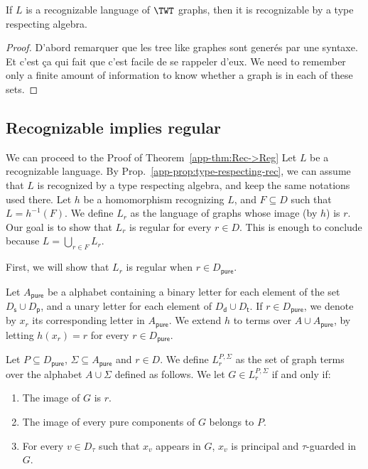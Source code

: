 \begin{lemma}\label{app-prop:type-respecting-rec}
If $L$ is a recognizable language of $\TWT$ graphs, then  it is recognizable by a type respecting algebra.
\end{lemma}

\begin{proof}
D'abord remarquer que les tree like graphes sont generés par une syntaxe. Et c'est ça qui fait que c'est facile de se rappeler d'eux.
We need to remember only a finite amount of information to know whether a graph is in each of these sets. 
\end{proof}





\subsection{Recognizable implies regular}

We can proceed to the Proof of Theorem~\ref{app-thm:Rec->Reg} Let $L$ be a recognizable language. By Prop.~\ref{app-prop:type-respecting-rec}, we can assume that $L$ is recognized by a type respecting algebra, and keep the same notations used there. Let $h$ be a homomorphism recognizing $L$, and $F\subseteq D$ such that $L=h^{-1}(F)$. We define $L_r$ as the language of graphs whose image (by $h$) is $r$. Our goal is to show that $L_r$ is regular for every $r\in D$. This is enough to conclude because 
$L=\underset{r\in F}{\bigcup}L_r$.
\medskip

First, we will show that $L_r$ is regular when {$r\in D_\mathsf{pure}$}. 
\medskip

  Let $A_\mathsf{pure}$ be a alphabet containing a binary letter for each element of the set $D_\mathsf{s}\cup D_\mathsf{p}$, and a unary letter for each element of  $D_\mathsf{d}\cup D_\mathsf{t}$. If $r\in D_{\mathsf{pure}}$, we denote by $x_r$ its corresponding letter in $A_\mathsf{pure}$. We extend $h$  to terms over  $A\cup A_\mathsf{pure}$, by letting $h(x_r)=r$ for every $r\in D_\mathsf{pure}$.
\smallskip

Let $P \subseteq  D_{\mathsf{pure}}$, $\Sigma\subseteq A_\mathsf{pure}$ and $r\in D$. We define $L^{P,\Sigma}_r$ as the set of graph terms over the alphabet $A\cup \Sigma$ defined as follows. We let $G\in L^{P,\Sigma}_r$  if and only if:
\begin{enumerate}
\item The image of $G$ is $r$.
\item The image of every pure components of $G$ belongs to $P$.
\item For every $v\in D_\mathsf{\tau}$ such that $x_v$ appears in $G$, $x_v$ is principal and $\tau$-guarded in $G$.
\end{enumerate}


